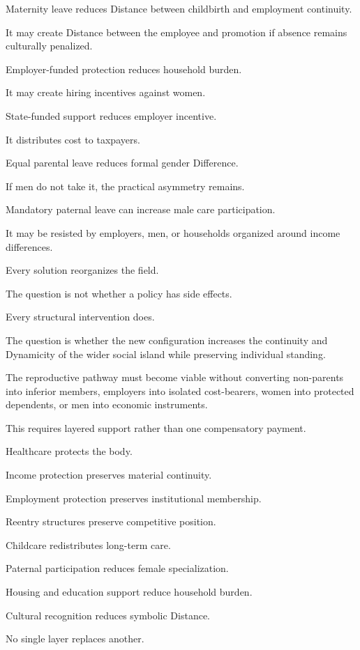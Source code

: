 Maternity leave reduces Distance between childbirth and employment continuity.

It may create Distance between the employee and promotion if absence remains culturally penalized.

Employer-funded protection reduces household burden.

It may create hiring incentives against women.

State-funded support reduces employer incentive.

It distributes cost to taxpayers.

Equal parental leave reduces formal gender Difference.

If men do not take it, the practical asymmetry remains.

Mandatory paternal leave can increase male care participation.

It may be resisted by employers, men, or households organized around income differences.

Every solution reorganizes the field.

The question is not whether a policy has side effects.

Every structural intervention does.

The question is whether the new configuration increases the continuity and Dynamicity of the wider social island while preserving individual standing.

The reproductive pathway must become viable without converting non-parents into inferior members, employers into isolated cost-bearers, women into protected dependents, or men into economic instruments.

This requires layered support rather than one compensatory payment.

Healthcare protects the body.

Income protection preserves material continuity.

Employment protection preserves institutional membership.

Reentry structures preserve competitive position.

Childcare redistributes long-term care.

Paternal participation reduces female specialization.

Housing and education support reduce household burden.

Cultural recognition reduces symbolic Distance.

No single layer replaces another.

